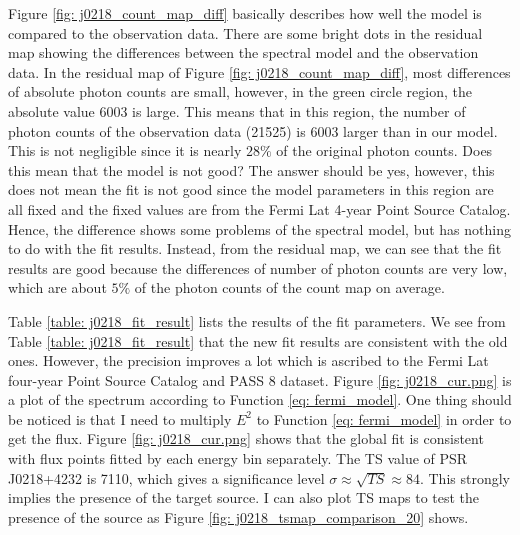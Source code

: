 \documentclass[12pt]{report}
\newcommand{\fgl}[0]{
  Fermi Lat four-year Point Source Catalog
}
\begin{document}
            Figure \ref{fig: j0218_count_map_diff} basically describes how well the model is 
            compared to the observation data. There are some bright dots in 
            the residual map showing the differences between the spectral model and the 
            observation data. In the residual map of Figure \ref{fig: j0218_count_map_diff}, 
            most differences of absolute photon counts are small, however, in the green 
            circle region, the absolute value 6003 is large. This means that in this region,
            the number of photon counts of the observation data (21525) is 6003 larger than 
            in our model. This is not negligible since it is nearly $28\%$ of the original 
            photon counts. Does this mean that the model is not good? The answer should be 
            yes, however, this does not mean the fit is not good since the model parameters 
            in this region are all fixed and the fixed values are from the Fermi Lat 4-year 
            Point Source Catalog. Hence, the difference shows some problems of the spectral 
            model, but has nothing to do with the fit results. Instead, from the residual map, 
            we can see that the fit results are good because the differences
            of number of photon counts are very low, which are about $5\%$ of the photon 
            counts of the count map on average.

            Table \ref{table: j0218_fit_result} lists the results of the fit parameters. 
            We see from Table \ref{table: j0218_fit_result} that the new fit results are 
            consistent with the old ones. However, the precision improves a lot which is 
            ascribed to the \fgl{} and PASS 8 dataset. Figure \ref{fig: j0218_cur.png} is a 
            plot of the spectrum according to Function \ref{eq: fermi_model}.
            One thing should be noticed is that I need to multiply $E^2$ to Function 
            \ref{eq: fermi_model} 
            in order to get the flux. Figure \ref{fig: j0218_cur.png} shows that 
            the global fit is consistent with flux points fitted by each energy bin separately. 
            The TS value of PSR J0218+4232 is 7110, which gives 
            a significance level $\sigma \approx \sqrt{TS} \approx 84$. This strongly implies the 
            presence of the target source. I can also plot TS maps to test the presence of the 
            source as Figure \ref{fig: j0218_tsmap_comparison_20} shows. 
            
\end{document}
